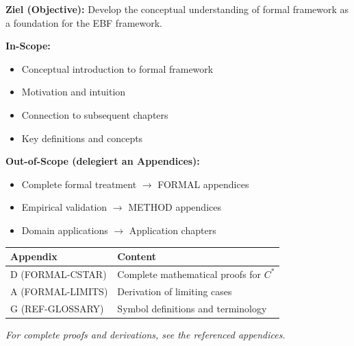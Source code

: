 \begin{tcolorbox}[
    colback=purple!5!white,
    colframe=purple!75!black,
    title={\textbf{Chapter Scope: Ziel / In-Scope / Out-of-Scope}},
    fonttitle=\bfseries
]

\textbf{Ziel (Objective):}
Develop the conceptual understanding of formal framework as a foundation for the EBF framework.

\vspace{0.3cm}
\textbf{In-Scope:}
\begin{itemize}[nosep]
    \item Conceptual introduction to formal framework
    \item Motivation and intuition
    \item Connection to subsequent chapters
    \item Key definitions and concepts
\end{itemize}

\vspace{0.3cm}
\textbf{Out-of-Scope (delegiert an Appendices):}
\begin{itemize}[nosep]
    \item Complete formal treatment $\rightarrow$ FORMAL appendices
    \item Empirical validation $\rightarrow$ METHOD appendices
    \item Domain applications $\rightarrow$ Application chapters
\end{itemize}

\end{tcolorbox}

\begin{tcolorbox}[
    colback=yellow!10!white,
    colframe=orange!75!black,
    title={\textbf{Appendix References for This Chapter}},
    fonttitle=\bfseries
]
\small
\begin{tabular}{@{}lp{8cm}@{}}
\textbf{Appendix} & \textbf{Content} \\
\midrule
D (FORMAL-CSTAR) & Complete mathematical proofs for $C^*$ \\
A (FORMAL-LIMITS) & Derivation of limiting cases \\
G (REF-GLOSSARY) & Symbol definitions and terminology \\
\end{tabular}

\medskip
\textit{For complete proofs and derivations, see the referenced appendices.}
\end{tcolorbox}

